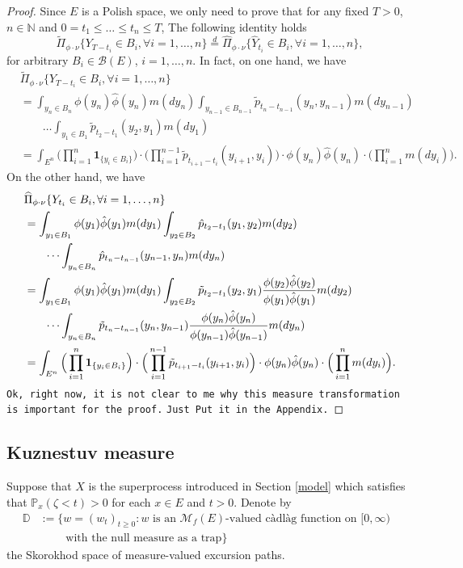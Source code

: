 \documentclass[12pt,a4paper]{amsart}
\numberwithin{equation}{section}
\theoremstyle{plain}
\theoremstyle{definition}
\theoremstyle{remark}
\begin{document}
\begin{proof}
	Since $E$ is a Polish space, we only need to prove that for any fixed $T>0$, $n \in \mathbb N$ and $0= t_1\leq \dots \leq t_n \leq T$,
	 The following identity holds
\[
	\widetilde \Pi_{\phi \cdot \nu}\{Y_{T-t_i}\in B_i,\forall i=1,\dots, n\}
	\overset{d}{=}\widehat \Pi_{\phi \cdot \nu}\{\widehat Y_{t_i}\in B_i,\forall i=1,\dots, n\},
\]
for arbitrary $B_i \in \mathscr B(E)$,  $i=1,\dots, n$.
	In fact, on one hand, we have
\begin{align}
	&\widetilde \Pi_{\phi \cdot \nu}\{Y_{T-t_i}\in B_i,\forall i=1,\dots, n\}
	\\&= \int_{y_n\in B_n} \phi(y_n)\hat\phi(y_n) m(dy_n)\int_{y_{n-1}\in B_{n-1}} \tilde p_{t_n - t_{n-1}}(y_n,y_{n-1})m(dy_{n-1})
	\\& \qquad \dots \int_{y_1\in B_1} \tilde p_{t_2 - t_1}(y_2,y_1)m(dy_1)
	\\&= \int_{E^n} \Big(\prod_{i=1}^n \mathbf 1_{\{y_i\in B_i\}}\Big)\cdot\Big(\prod_{i=1}^{n-1} \tilde p_{t_{i+1}-t_i}(y_{i+1},y_i)\Big)\cdot\phi(y_n)\hat\phi(y_n)\cdot \Big(\prod_{i=1}^nm(dy_i)\Big).
\end{align}
	On the other hand, we have
\begin{align}
	&\widehat \Pi_{\phi\cdot\nu}\{Y_{t_i}\in B_i, \forall i = 1,\dots, n\}
	\\&= \int_{y_1\in B_1} \phi(y_1)\hat \phi(y_1)m(dy_1) \int_{y_2\in B_2} \hat p_{t_2-t_1}(y_1,y_2)m(dy_2)
	\\&\qquad \dots\int_{y_n\in B_n}\hat p_{t_n-t_{n-1}}(y_{n-1},y_n)m(dy_n)
	\\&= \int_{y_1\in  B_1} \phi(y_1)\hat \phi(y_1)m(dy_1) \int_{y_2\in B_2} \tilde p_{t_2-t_1}(y_2,y_1)\frac{\phi(y_2)\hat \phi(y_2)}{\phi(y_1)\hat \phi(y_1)}m(dy_2)
	\\&\qquad \dots\int_{y_n\in B_n}\tilde p_{t_n-t_{n-1}}(y_n,y_{n-1})\frac{\phi(y_n)\hat\phi(y_n)}{\phi(y_{n-1})\hat\phi(y_{n-1})}m(dy_n)
	\\&= \int_{E^n} \Big(\prod_{i=1}^n \mathbf 1_{\{y_i\in B_i\}}\Big)\cdot\Big(\prod_{i=1}^{n-1} \tilde p_{t_{i+1}-t_i}(y_{i+1},y_i)\Big)\cdot\phi(y_n)\hat\phi(y_n)\cdot \Big(\prod_{i=1}^n m(dy_i)\Big).
\qedhere
\end{align}
{\tt Ok, right now, it is not clear to me why this measure transformation is important for the proof.}
{\tt Just Put it in the Appendix.}
\end{proof}

\subsection{Kuznestuv measure}
	Suppose that $X$ is the superprocess introduced in Section \ref{model} which satisfies that $\mathbb P_{x}(\zeta < t)>0$ for each $x\in E$ and $t>0$. Denote by
\begin{align}
	\mathbb D &:=\{ w= (w_t)_{t\geq 0}: w \text{ is an $\mathcal M_f(E)$-valued c\`{a}dl\`{a}g function on $[0,\infty)$ }
	\\ &\qquad \text{ with the null measure as a trap} \}
\end{align}
	the Skorokhod space of measure-valued excursion paths.
\end{document}
